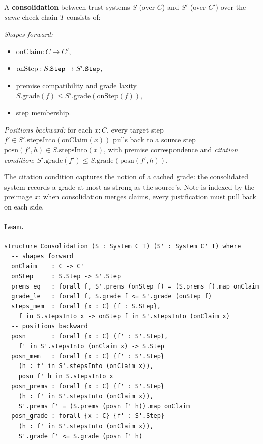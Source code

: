 \documentclass[11pt,a4paper]{article}
\begin{document}
\begin{defn}[Consolidation]
A \textbf{consolidation} between trust systems $S$ (over $C$) and $S'$ (over
$C'$) over the \emph{same} check-chain $T$ consists of:

\textit{Shapes forward:}
\begin{itemize}
  \item $\mathrm{onClaim} : C \to C'$,
  \item $\mathrm{onStep} : S.\texttt{Step} \to S'.\texttt{Step}$,
  \item premise compatibility and grade laxity $S.\mathrm{grade}(f) \le
    S'.\mathrm{grade}(\mathrm{onStep}(f))$,
  \item step membership.
\end{itemize}

\textit{Positions backward:} for each $x : C$, every target step
$f' \in S'.\mathrm{stepsInto}(\mathrm{onClaim}(x))$ pulls back to a source
step $\mathrm{posn}(f', h) \in S.\mathrm{stepsInto}(x)$, with premise
correspondence and \emph{citation condition}: $S'.\mathrm{grade}(f') \le
S.\mathrm{grade}(\mathrm{posn}(f', h))$.

The citation condition captures the notion of a cached grade: the consolidated
system records a grade at most as strong as the source's.  Note 
is indexed by the preimage $x$: when consolidation merges claims, every
justification must pull back on each side.
\end{defn}

\paragraph{Lean.}
\begin{lstlisting}[style=lean]
structure Consolidation (S : System C T) (S' : System C' T) where
  -- shapes forward
  onClaim    : C -> C'
  onStep     : S.Step -> S'.Step
  prems_eq   : forall f, S'.prems (onStep f) = (S.prems f).map onClaim
  grade_le   : forall f, S.grade f <= S'.grade (onStep f)
  steps_mem  : forall {x : C} {f : S.Step},
    f in S.stepsInto x -> onStep f in S'.stepsInto (onClaim x)
  -- positions backward
  posn       : forall {x : C} (f' : S'.Step),
    f' in S'.stepsInto (onClaim x) -> S.Step
  posn_mem   : forall {x : C} {f' : S'.Step}
    (h : f' in S'.stepsInto (onClaim x)),
    posn f' h in S.stepsInto x
  posn_prems : forall {x : C} {f' : S'.Step}
    (h : f' in S'.stepsInto (onClaim x)),
    S'.prems f' = (S.prems (posn f' h)).map onClaim
  posn_grade : forall {x : C} {f' : S'.Step}
    (h : f' in S'.stepsInto (onClaim x)),
    S'.grade f' <= S.grade (posn f' h)
\end{lstlisting}
\end{document}
